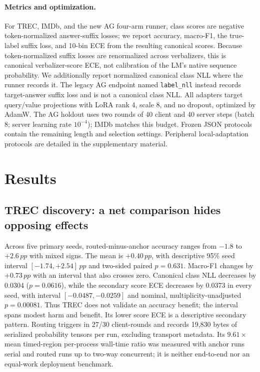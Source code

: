 \documentclass[letterpaper]{article}
\newcommand{\pp}{\,pp}
\begin{document}
\paragraph{Metrics and optimization.}
For TREC, IMDb, and the new AG four-arm runner, class scores are negative
token-normalized answer-suffix losses; we report accuracy, macro-F1, the
true-label suffix loss, and 10-bin ECE from
the resulting canonical scores.  Because token-normalized suffix losses are
renormalized across verbalizers, this is canonical verbalizer-score ECE, not
calibration of the LM's native sequence probability.  We additionally report
normalized canonical class NLL where the runner records it.  The legacy AG
endpoint named \texttt{label\_nll} instead records target-answer suffix loss
and is not a canonical class NLL.  All adapters target query/value projections with LoRA rank 4, scale 8, and no
dropout, optimized by AdamW.  The AG holdout uses two rounds of 40 client and
40 server steps (batch 8; server learning rate \(10^{-4}\)); IMDb matches this
budget.  Frozen JSON protocols contain the remaining length and selection
settings.  Peripheral local-adaptation protocols are detailed in the
supplementary material.

\FloatBarrier
\section{Results}
\subsection{TREC discovery: a net comparison hides opposing effects}
Across five primary seeds, routed-minus-anchor accuracy ranges from \(-1.8\)
to \(+2.6\pp\)
with mixed signs.  The mean is \(+0.40\pp\), with descriptive 95\% seed
interval \([-1.74,+2.54]\pp\) and two-sided paired \(p=0.631\).
Macro-F1 changes by \(+0.73\pp\) with an interval that also crosses zero.
Canonical class NLL decreases by 0.0304 (\(p=0.0616\)), while the secondary score ECE decreases
by 0.0373 in every seed, with interval \([-0.0487,-0.0259]\) and
nominal, multiplicity-unadjusted \(p=0.00081\).  Thus TREC does not validate an
accuracy benefit; the interval spans modest harm and benefit.  Its lower score ECE
is a descriptive secondary pattern.  Routing triggers in 27/30 client-rounds
and records 19,830 bytes of serialized probability tensors per run, excluding
transport metadata.  Its \(9.61\times\) mean timed-region per-process wall-time
ratio was measured with anchor runs serial and routed runs up to two-way
concurrent; it is neither end-to-end nor an equal-work deployment benchmark.
\end{document}
